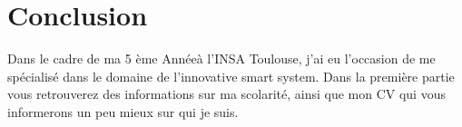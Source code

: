 \chapter{Conclusion}
\thispagestyle{fancy}


Dans le cadre de ma 5 ème Annéeà l'INSA Toulouse, j'ai eu l'occasion de me spécialisé dans le domaine de l'innovative smart system.
Dans la première partie vous retrouverez des informations sur ma scolarité, ainsi que mon CV qui vous informerons un peu mieux sur qui je suis.